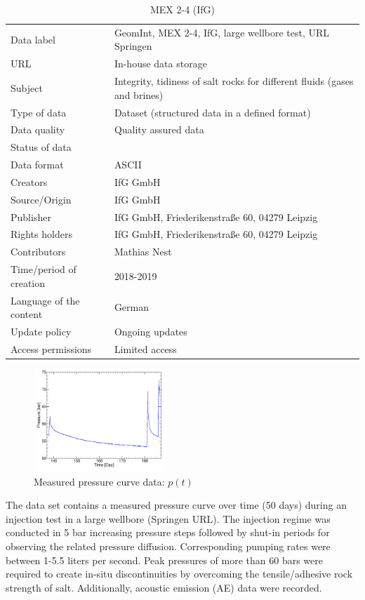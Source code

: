 \begin{table}[!ht]
\caption{MEX 2-4 (IfG)}
\label{tab:dms-mex2-4}
\small
\begin{tabular}{R{3.5cm}|L{7cm}}
\hline
%
Data label              & GeomInt, MEX 2-4, IfG, large wellbore test, URL Springen \\
URL                     & In-house data storage \\
Subject                 & Integrity, tidiness of salt rocks for different fluids (gases and brines) \\
Type of data            & Dataset (structured data in a defined format) \\
Data quality            & Quality assured data \\
Status of data          &  \\
Data format             & ASCII \\
Creators                & IfG GmbH \\
Source/Origin           & IfG GmbH \\
Publisher               & IfG GmbH, Friederikenstra\ss e 60, 04279 Leipzig\\
Rights holders          & IfG GmbH, Friederikenstra\ss e 60, 04279 Leipzig \\
Contributors            & Mathias Nest \\
Time/period of creation & 2018-2019 \\
Language of the content & German \\
Update policy           & Ongoing updates \\
Access permissions      & Limited access \\
%
\hline
\end{tabular}
\end{table}

\begin{figure}
\centering
\includegraphics[width=5cm]{figures/IfG-Druckkurve-50d.png}
\caption{Measured pressure curve data: $p(t)$}
\label{fig:dms-mex24}
\end{figure}

The data set contains a measured pressure curve over time (50 days) during an injection test in a large wellbore (Springen URL). The injection regime was conducted in 5 bar increasing pressure steps followed by shut-in periods for observing the related pressure diffusion. Corresponding pumping rates were between 1-5.5 liters per second. Peak pressures of more than 60 bars were required to create in-situ discontinuities by overcoming the tensile/adhesive rock strength of salt. Additionally, acoustic emission (AE) data were recorded.